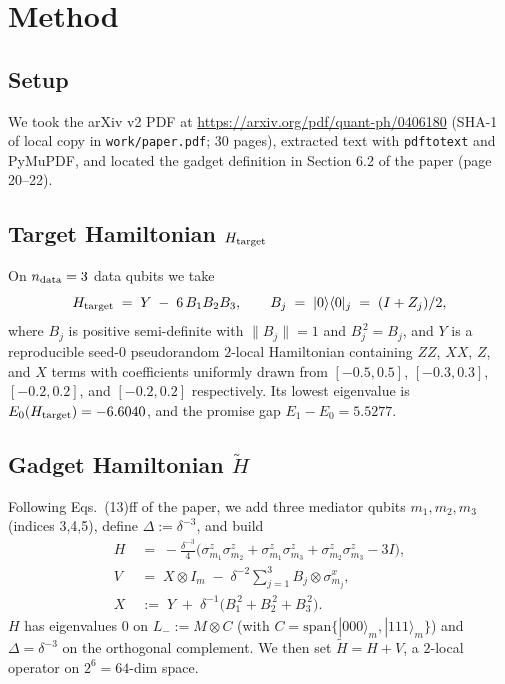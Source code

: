 \documentclass[11pt]{article}
\begin{document}
\section{Method}

\subsection{Setup}
We took the arXiv v2 PDF at
\url{https://arxiv.org/pdf/quant-ph/0406180}
(SHA-1 of local copy in \texttt{work/paper.pdf}; 30 pages), extracted
text with \texttt{pdftotext} and PyMuPDF, and located the gadget
definition in Section 6.2 of the paper (page 20--22).

\subsection{Target Hamiltonian $H_{\rm target}$}
On $n_{\rm data} = 3$ data qubits we take
\[
    H_{\rm target} \;=\; Y \;-\; 6\, B_1 B_2 B_3,
    \qquad
    B_j \;=\; |0\rangle\langle 0|_j \;=\; (I + Z_j)/2,
\]
where $B_j$ is positive semi-definite with $\|B_j\|=1$ and
$B_j^{\,2}=B_j$, and $Y$ is a reproducible seed-0 pseudorandom
$2$-local Hamiltonian containing $ZZ$, $XX$, $Z$, and $X$ terms with
coefficients uniformly drawn from $[-0.5,0.5]$, $[-0.3,0.3]$,
$[-0.2,0.2]$, and $[-0.2,0.2]$ respectively.  Its lowest eigenvalue is
$E_0(H_{\rm target}) = -6.6040$, and the promise gap
$E_1 - E_0 = 5.5277$.

\subsection{Gadget Hamiltonian $\widetilde H$}
Following Eqs.~(13)ff of the paper, we add three mediator qubits
$m_1,m_2,m_3$ (indices 3,4,5), define
$\Delta := \delta^{-3}$, and build
\begin{align}
H &\;=\; -\frac{\delta^{-3}}{4}\bigl(\sigma^z_{m_1}\sigma^z_{m_2}
      + \sigma^z_{m_1}\sigma^z_{m_3} + \sigma^z_{m_2}\sigma^z_{m_3}
      - 3I\bigr), \\
V &\;=\; X \otimes I_m \;-\; \delta^{-2}\sum_{j=1}^{3}
       B_j \otimes \sigma^x_{m_j}, \\
X &\;:=\; Y \;+\; \delta^{-1}\bigl(B_1^{\,2}+B_2^{\,2}+B_3^{\,2}\bigr).
\end{align}
$H$ has eigenvalues $0$ on $L_- := M \otimes C$
(with $C = \mathrm{span}\{|000\rangle_m,|111\rangle_m\}$) and
$\Delta = \delta^{-3}$ on the orthogonal complement.  We then set
$\widetilde H = H + V$, a $2$-local operator on $2^{6}=64$-dim space.
\end{document}
